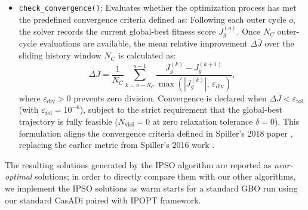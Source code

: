\begin{itemize}
    \item \texttt{check\_convergence()}: Evaluates whether the optimization process has met the predefined convergence criteria defined as:
    Following each outer cycle $o$, the solver records the current global-best fitness score $J_g^{(o)}$. 
    Once $N_C$ outer-cycle evaluations are available, the mean relative improvement $\Delta \bar{J}$ over the sliding history window $N_C$ is calculated as:
    \begin{equation}
        \Delta \bar{J} = \frac{1}{N_C} \sum_{k=o - N_C}^{o - 1} \frac{J_g^{(k)} - J_g^{(k+1)}}{\max\left(|J_g^{(k)}|, \, \varepsilon_{\text{div}}\right)},
        \label{eq:ipso-convergence}
    \end{equation}
    where $\varepsilon_{\text{div}} > 0$ prevents zero division. Convergence is declared when $\Delta \bar{J} < \varepsilon_{\text{tol}}$ (with $\varepsilon_{\text{tol}} = 10^{-6}$), subject to the strict requirement that the global-best trajectory is fully feasible ($N_{\mathrm{viol}} = 0$ at zero relaxation tolerance $\delta = 0$). 
    This formulation aligns the convergence criteria defined in Spiller's 2018 paper \cite{Spiller18}, replacing the earlier metric from Spiller's 2016 work \cite{Spiller16}. 
\end{itemize} 

The resulting solutions generated by the IPSO algorithm are reported as \emph{near-optimal} solutions; in order to directly compare them with our other algorithms, we implement the \ac{IPSO} solutions as warm starts for a standard \ac{GBO} run using our standard \ac{CasADi} paired with \ac{IPOPT} framework.

